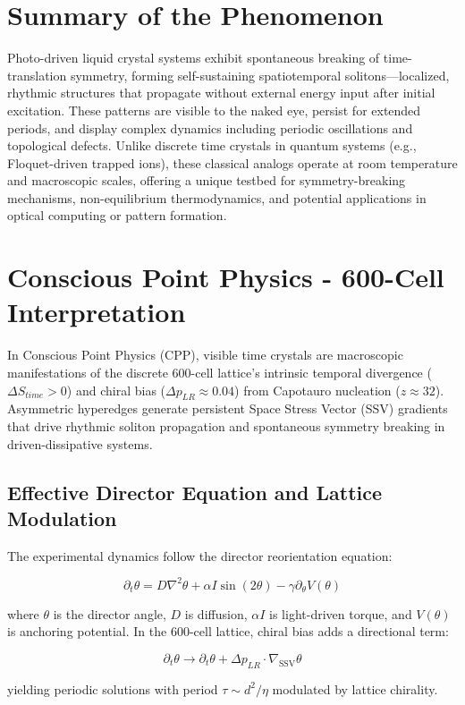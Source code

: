 \documentclass[11pt]{article}
\begin{document}
\section{Summary of the Phenomenon}
Photo-driven liquid crystal systems exhibit spontaneous breaking of time-translation symmetry, forming self-sustaining spatiotemporal solitons—localized, rhythmic structures that propagate without external energy input after initial excitation. These patterns are visible to the naked eye, persist for extended periods, and display complex dynamics including periodic oscillations and topological defects. Unlike discrete time crystals in quantum systems (e.g., Floquet-driven trapped ions), these classical analogs operate at room temperature and macroscopic scales, offering a unique testbed for symmetry-breaking mechanisms, non-equilibrium thermodynamics, and potential applications in optical computing or pattern formation.

\section{Conscious Point Physics - 600-Cell Interpretation}
In Conscious Point Physics (CPP), visible time crystals are macroscopic manifestations of the discrete 600-cell lattice's intrinsic temporal divergence ($\Delta S_{time} > 0$) and chiral bias ($\Delta p_{LR} \approx 0.04$) from Capotauro nucleation ($z \approx 32$). Asymmetric hyperedges generate persistent Space Stress Vector (SSV) gradients that drive rhythmic soliton propagation and spontaneous symmetry breaking in driven-dissipative systems.

\subsection{Effective Director Equation and Lattice Modulation}
The experimental dynamics follow the director reorientation equation:

\[
\partial_t \theta = D \nabla^2 \theta + \alpha I \sin(2\theta) - \gamma \partial_\theta V(\theta)
\]

where $\theta$ is the director angle, $D$ is diffusion, $\alpha I$ is light-driven torque, and $V(\theta)$ is anchoring potential. In the 600-cell lattice, chiral bias adds a directional term:

\[
\partial_t \theta \to \partial_t \theta + \Delta p_{LR} \cdot \nabla_{\text{SSV}} \theta
\]

yielding periodic solutions with period $\tau \sim d^2 / \eta$ modulated by lattice chirality.
\end{document}
